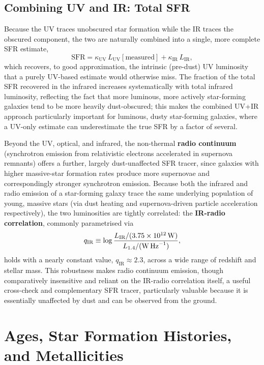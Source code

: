 \subsection{Combining UV and IR: Total SFR} \label{subsec:sfr_combined}

Because the UV traces unobscured star formation while the IR traces the obscured component, the two are naturally combined into a single, more complete SFR estimate,
$$
\text{SFR} = \kappa_{\text{UV}}\,L_{\text{UV}}[\text{measured}] + \kappa_{\text{IR}}\,L_{\text{IR}} ,
$$
which recovers, to good approximation, the intrinsic (pre-dust) UV luminosity that a purely UV-based estimate would otherwise miss. The fraction of the total SFR recovered in the infrared increases systematically with total infrared luminosity, reflecting the fact that more luminous, more actively star-forming galaxies tend to be more heavily dust-obscured; this makes the combined UV+IR approach particularly important for luminous, dusty star-forming galaxies, where a UV-only estimate can underestimate the true SFR by a factor of several.

\begin{tipsblock}
Beyond the UV, optical, and infrared, the non-thermal \textbf{radio continuum} (synchrotron emission from relativistic electrons accelerated in supernova remnants) offers a further, largely dust-unaffected SFR tracer, since galaxies with higher massive-star formation rates produce more supernovae and correspondingly stronger synchrotron emission. Because both the infrared and radio emission of a star-forming galaxy trace the same underlying population of young, massive stars (via dust heating and supernova-driven particle acceleration respectively), the two luminosities are tightly correlated: the \textbf{IR-radio correlation}, commonly parametrised via
$$
q_{\text{IR}} \equiv \log\frac{L_{\text{IR}}/(3.75\times10^{12}\,\text{W})}{L_{1.4}/(\text{W\,Hz}^{-1})} ,
$$
holds with a nearly constant value, $q_{\text{IR}} \approx 2.3$, across a wide range of redshift and stellar mass. This robustness makes radio continuum emission, though comparatively insensitive and reliant on the IR-radio correlation itself, a useful cross-check and complementary SFR tracer, particularly valuable because it is essentially unaffected by dust and can be observed from the ground.
\end{tipsblock}

\section{Ages, Star Formation Histories, and Metallicities} \label{sec:age_sfh_metallicity}

